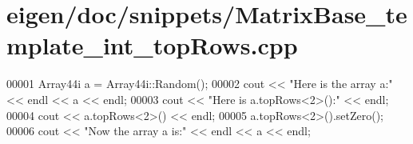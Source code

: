 \hypertarget{eigen_2doc_2snippets_2_matrix_base__template__int__top_rows_8cpp_source}{}\section{eigen/doc/snippets/\+Matrix\+Base\+\_\+template\+\_\+int\+\_\+top\+Rows.cpp}
\label{eigen_2doc_2snippets_2_matrix_base__template__int__top_rows_8cpp_source}

\begin{DoxyCode}
00001 Array44i a = Array44i::Random();
00002 cout << \textcolor{stringliteral}{"Here is the array a:"} << endl << a << endl;
00003 cout << \textcolor{stringliteral}{"Here is a.topRows<2>():"} << endl;
00004 cout << a.topRows<2>() << endl;
00005 a.topRows<2>().setZero();
00006 cout << \textcolor{stringliteral}{"Now the array a is:"} << endl << a << endl;
\end{DoxyCode}
